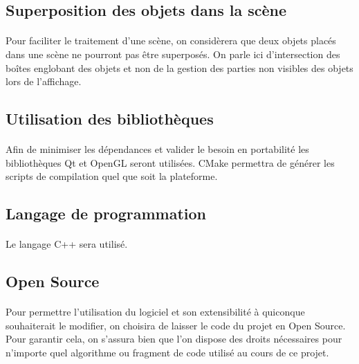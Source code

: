 \subsection{Superposition des objets dans la scène}

\paragraph{}
	Pour faciliter le traitement d’une scène, on considèrera que deux objets placés dans une scène ne pourront pas être superposés. On parle ici d’intersection des boîtes englobant des objets et non de la gestion des parties non visibles des objets lors de l’affichage.

\subsection{Utilisation des bibliothèques}

\paragraph{}
	Afin de minimiser les dépendances et valider le besoin en portabilité les bibliothèques Qt et OpenGL seront utilisées. CMake permettra de générer les scripts de compilation quel que soit la plateforme.
	
\subsection{Langage de programmation}

\paragraph{}
	Le langage C++ sera utilisé.

\subsection{Open Source}

\paragraph{}
	Pour permettre l’utilisation du logiciel et son extensibilité à quiconque souhaiterait le modifier, on choisira de laisser le code du projet en Open Source. Pour garantir cela, on s’assura bien que l’on dispose des droits nécessaires pour n’importe quel algorithme ou fragment de code utilisé au cours de ce projet.
	